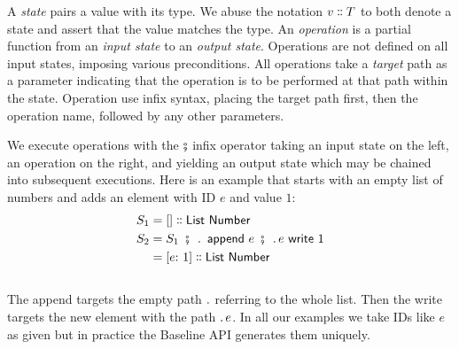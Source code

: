 \documentclass[english,submission]{programming}
\theoremstyle{definition}
\newcommand{\mathbox}[1]{\colorbox{black!10}{$#1$\phantom{i\hspace{-3.5pt}}}}
\DeclareMathOperator{\exec}{\ \fatsemi\ \ }
\newcommand{\is}{{:}\ }
\newcommand{\isa}{\dblcolon}
\begin{document}
A \textit{state} pairs a value with its type. We abuse the notation \mathbox{v \isa T} to both denote a state and assert that the value matches the type.
An \textit{operation} is a partial function from an \textit{input state} to an \textit{output state}. Operations are not defined on all input states, imposing various preconditions.
All operations take a \textit{target} path as a parameter indicating that the operation is to be performed at that path within the state.
Operation use infix syntax, placing the target path first, then the operation name, followed by any other parameters.




We execute operations with the \mathbox{\fatsemi} infix operator taking an input state on the left, an operation on the right, and yielding an output state which may be chained into subsequent executions. Here is an example that starts with an empty list of numbers and adds an element with ID $e$ and value $1$:
\begin{align*}
  S_1 &= [] \isa \textsf{List Number}\\
  S_2 &= S_1 \exec \ldotp \textsf{ append } e \exec \ldotp e \textsf{ write } 1\\
  &= [e \is 1] \isa \textsf{List Number}\\
\end{align*}
\vspace{-30pt}\\
The \textsf{append} targets the empty path \mathbox{\ldotp} referring to the whole list. Then the \textsf{write} targets the new element with the path \mathbox{\ldotp e}. In all our examples we take IDs like \mathbox{e} as given but in practice the Baseline API generates them uniquely.
\end{document}
